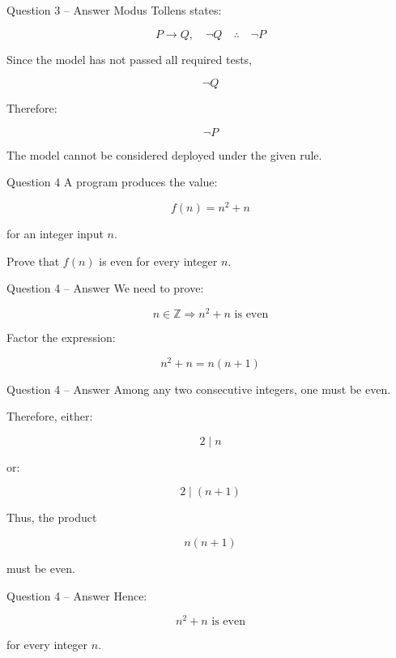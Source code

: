 \begin{frame}{Question 3 -- Answer}
Modus Tollens states:

$$
P\rightarrow Q,\quad\neg Q
\quad\therefore\quad\neg P
$$

Since the model has not passed all required tests,

$$
\neg Q
$$

Therefore:

$$
\boxed{\neg P}
$$

The model cannot be considered deployed under the given rule.
\end{frame}


\begin{frame}{Question 4}
A program produces the value:

$$
f(n)=n^2+n
$$

for an integer input $n$.

Prove that $f(n)$ is even for every integer $n$.
\end{frame}

\begin{frame}{Question 4 -- Answer}
We need to prove:

$$
n\in\mathbb Z\Rightarrow n^2+n\text{ is even}
$$

Factor the expression:

$$
n^2+n=n(n+1)
$$

\end{frame}

\begin{frame}{Question 4 -- Answer}
Among any two consecutive integers, one must be even.

Therefore, either:

$$
2\mid n
$$

or:

$$
2\mid(n+1)
$$

Thus, the product

$$
n(n+1)
$$

must be even.
\end{frame}

\begin{frame}{Question 4 -- Answer}
Hence:

$$
\boxed{n^2+n\text{ is even}}
$$

for every integer $n$.
\end{frame}


